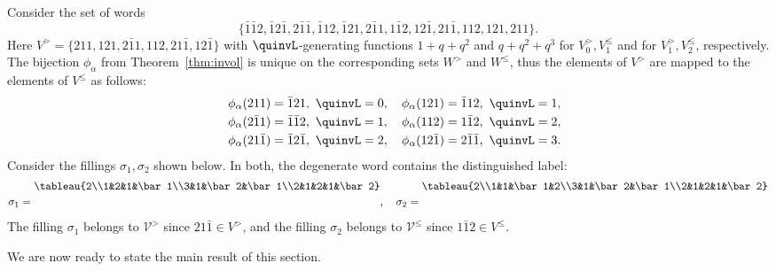 \begin{example}\label{ex:u_choice}
Consider the set of words 
\[
\{\bar1\bar12,\bar12\bar1, 2\bar1\bar1,\bar112,\bar121, 2\bar11,1\bar12,12\bar1,21\bar1,112,121,211\}.
\] 
Here $V^{>}=\{211,121,2\bar11,112,21\bar1, \allowbreak 12\bar1\}$ with $\quinvL$-generating functions $1+q+q^2$ and $q+q^2+q^3$ for $V^{>}_0, V^{\leq}_1$ and for $V^{>}_1,V^{\leq}_2$, respectively. The bijection $\phi_\alpha$ from Theorem~\ref{thm:invol} is unique on the corresponding sets $W^{>}$ and $W^{\leq}$, thus the elements of $V^{>}$ are mapped to the elements of $V^{\leq}$ as follows: 
\begin{align*}
\phi_\alpha(211) &= \bar121,\ \quinvL=0, \quad \phi_\alpha(121) = \bar112,\ \quinvL=1,\\
\phi_\alpha(2\bar11) &= \bar1\bar12,\ \quinvL=1, \quad \phi_\alpha(112)=1\bar12,\ \quinvL=2, \\
\quad \phi_\alpha(21\bar1) &=\bar12\bar1,\  \quinvL=2, \quad \phi_\alpha(12\bar1)=2\bar1\bar1,\ \quinvL=3.
\end{align*}
Consider the fillings $\sigma_1, \sigma_2$ shown below. In both, the degenerate word contains the distinguished label:
\[
\sigma_1=\raisebox{0.2in}{\tableau{2\\1&2&1&\bar1\\3&1&\bar2&\bar1\\2&1&2&1&\bar2}},
\quad
\sigma_2=\raisebox{0.2in}{\tableau{2\\1&1&\bar1&2\\3&1&\bar2&\bar1\\2&1&2&1&\bar2}}
\]
The filling $\sigma_1$ belongs to $\mathcal{V}^{>}$ since $21\bar1\in V^{>}$, and the filling $\sigma_2$ belongs to $\mathcal{V}^{\leq}$ since $1\bar12\in V^{\leq}$. 
\end{example}

We are now ready to state the main result of this section.

